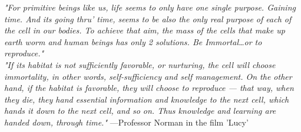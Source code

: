 \textit{"For primitive beings like us, life seems to only have one single purpose. Gaining time. And its going thru’ time, seems to be also the only real purpose of each of the cell in our bodies. To achieve that aim, the mass of the cells that make up earth worm and human beings has only 2 solutions. Be Immortal…or to reproduce."}
\\
\textit{"If its habitat is not sufficiently favorable, or nurturing, the cell will choose immortality, in other words, self-sufficiency and self management. On the other hand, if the habitat is favorable, they will choose to reproduce — that way, when they die, they hand essential information and knowledge to the next cell, which hands it down to the next cell, and so on. Thus knowledge and learning are handed down, through time."}
---Professor Norman in the film 'Lucy'